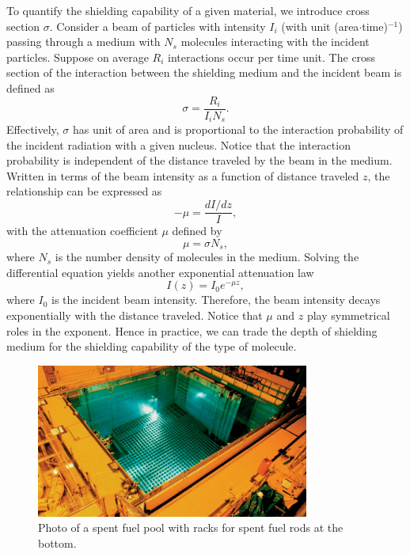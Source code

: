 \documentclass[nofootinbib,preprint,aps]{revtex4-1}
\begin{document}
    To quantify the shielding capability of a given material, we introduce cross section $\sigma$. Consider
    a beam of particles with intensity $I_i$ (with unit (area$\cdot$time)${}^{-1}$) passing through a medium
    with $N_s$ molecules interacting with the incident particles.
    Suppose on average $R_i$ interactions occur per time unit.
    The cross section of the interaction between the shielding medium and the incident beam is defined as
    \begin{equation}
        \sigma = \frac{R_i}{I_i N_s}.
    \end{equation}
    Effectively, $\sigma$ has unit of area and
    is proportional to the interaction probability of the incident radiation with a given nucleus.\cite{k88}
    Notice that the interaction probability is independent of the distance traveled by the beam in
    the medium. Written in terms of the beam intensity as a function of distance traveled $z$,
    the relationship can be expressed as
    \begin{equation}
        -\mu = \frac{d I/dz}{I},
    \end{equation}
    with the attenuation coefficient $\mu$ defined by
    \begin{equation}
        \mu = \sigma N_s,
    \end{equation}
    where $N_s$ is the number density of molecules in the medium.
    Solving the differential
    equation yields another exponential attenuation law
    \begin{equation}
        \label{eq:atten}
        I(z) = I_0 e^{-\mu z},
    \end{equation}
    where $I_0$ is the incident beam intensity. Therefore, the beam intensity decays exponentially
    with the distance traveled. Notice that $\mu$ and $z$ play symmetrical roles in the exponent. Hence
    in practice, we can trade the depth of shielding medium for the shielding capability of the type of
    molecule.
        \begin{figure}
            \centering
            \includegraphics[width=0.8\textwidth]{pool.jpg}
            \caption{Photo of a spent fuel pool with racks for spent fuel rods at the bottom.\cite{s16}}
            \label{fig:pool}
        \end{figure}
\end{document}
